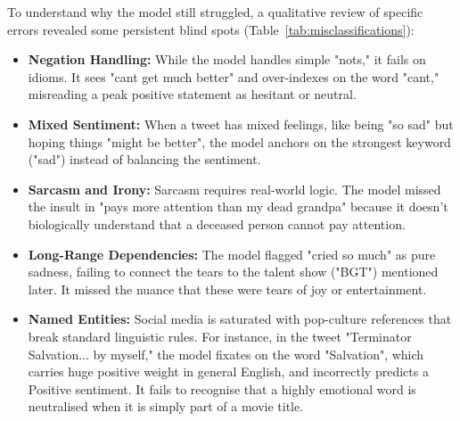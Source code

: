 \documentclass[12pt, a4paper]{article}
\begin{document}
\noindent To understand why the model still struggled, a qualitative review of specific errors revealed some persistent blind spots (Table~\ref{tab:misclassifications}):

\begin{itemize}
    \item \textbf{Negation Handling:} While the model handles simple "nots," it fails on idioms. It sees "cant get much better" and over-indexes on the word "cant," misreading a peak positive statement as hesitant or neutral.

    \item \textbf{Mixed Sentiment:} When a tweet has mixed feelings, like being "so sad" but hoping things "might be better", the model anchors on the strongest keyword ("sad") instead of balancing the sentiment.

    \item \textbf{Sarcasm and Irony:} Sarcasm requires real-world logic. The model missed the insult in "pays more attention than my dead grandpa" because it doesn't biologically understand that a deceased person cannot pay attention.

    \item \textbf{Long-Range Dependencies:} The model flagged "cried so much" as pure sadness, failing to connect the tears to the talent show ("BGT") mentioned later. It missed the nuance that these were tears of joy or entertainment.

    \item \textbf{Named Entities:} Social media is saturated with pop-culture references that break standard linguistic rules. For instance, in the tweet "Terminator Salvation... by myself," the model fixates on the word "Salvation", which carries huge positive weight in general English, and incorrectly predicts a Positive sentiment. It fails to recognise that a highly emotional word is neutralised when it is simply part of a movie title.
\end{itemize}
\end{document}
